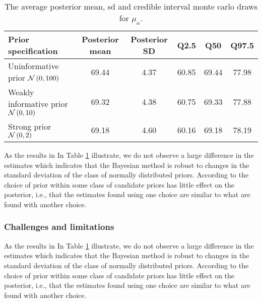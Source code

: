 \begin{table}[!ht]
	\begin{center}
		\begin{tabular}{l | c c c c c}
			Prior specification & Posterior mean & Posterior SD & Q2.5 & Q50 & Q97.5\\
			\hline
			Uninformative prior $\mathcal{N}\left(0,100\right)$ & 69.44 & 4.37 & 60.85 & 69.44 & 77.98 \\
			Weakly informative prior $\mathcal{N}\left(0,10\right)$ & 69.32 &   4.38  & 60.75 &   69.33 &   77.88 \\
			Strong prior $\mathcal{N}\left(0,2\right)$ & 69.18 & 4.60 &  60.16 &  69.18  & 78.19
		\end{tabular}
	\end{center}
	\caption{The average posterior mean, sd and credible interval monte carlo draws for $\mu_{\alpha}$.}
	\label{tab:robustness}
\end{table} 
As the results in In Table \ref{tab:robustness} illustrate, we do not observe a large difference in the estimates which indicates that the Bayesian method is robust to changes in the standard deviation of the class of normally distributed priors. According to \cite{edwards1963bayesian}  the choice of prior within some class of candidate priors has little effect on the posterior, i.e., that the estimates found using one choice are similar to what are found with another choice.  

\subsubsection{Challenges and limitations}
As the results in In Table \ref{tab:robustness} illustrate, we do not observe a large difference in the estimates which indicates that the Bayesian method is robust to changes in the standard deviation of the class of normally distributed priors. According to \cite{edwards1963bayesian}  the choice of prior within some class of candidate priors has little effect on the posterior, i.e., that the estimates found using one choice are similar to what are found with another choice.  